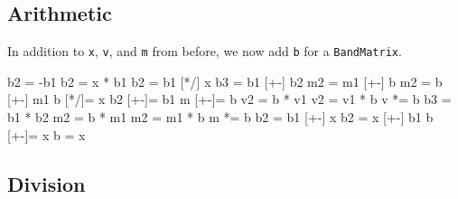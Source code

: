 \documentclass[twoside,letterpaper,11pt]{article}
\renewcommand{\tt}[1]{{\lstinline {#1}}}
\begin{document}
\subsection{Arithmetic}
\label{BandMatrix_Arithmetic}

In addition to \tt{x}, \tt{v}, and \tt{m} from before, we now add \tt{b} 
for a \tt{BandMatrix}.

\begin{tmvcode}
b2 = -b1
b2 = x * b1
b2 = b1 [*/] x
b3 = b1 [+-] b2
m2 = m1 [+-] b
m2 = b [+-] m1
b [*/]= x
b2 [+-]= b1
m [+-]= b
v2 = b * v1
v2 = v1 * b
v *= b
b3 = b1 * b2
m2 = b * m1
m2 = m1 * b
m *= b
b2 = b1 [+-] x
b2 = x [+-] b1
b [+-]= x
b = x
\end{tmvcode}

\subsection{Division}
\label{BandMatrix_Division}
\end{document}
